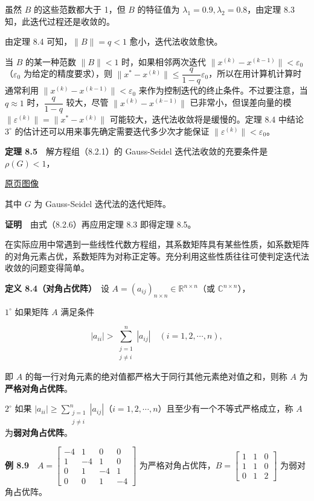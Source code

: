 \documentclass[
  10pt,
  fontset=fandol]{ctexart}
\begin{document}
虽然 \(B\) 的这些范数都大于 1，但 \(B\) 的特征值为 \(\lambda_1=0.9,\lambda_2=0.8\)，由定理 8.3 知，此迭代过程还是收敛的。

由定理 8.4 可知，\(\|B\|=q<1\) 愈小，迭代法收敛愈快。

当 \(B\) 的某一种范数 \(\|B\|<1\) 时，如果相邻两次迭代 \(\|x^{(k)}-x^{(k-1)}\|<\varepsilon_0\)（\(\varepsilon_0\) 为给定的精度要求），则 \(\|x^*-x^{(k)}\|\leqslant\dfrac{q}{1-q}\varepsilon_0\)，所以在用计算机计算时通常利用 \(\|x^{(k)}-x^{(k-1)}\|<\varepsilon_0\) 来作为控制迭代的终止条件。不过要注意，当 \(q\approx1\) 时，\(\dfrac{q}{1-q}\) 较大，尽管 \(\|x^{(k)}-x^{(k-1)}\|\) 已非常小，但误差向量的模 \(\|\varepsilon^{(k)}\|=\|x^*-x^{(k)}\|\) 可能较大，迭代法收敛将是缓慢的。定理 8.4 中结论 \(3^\circ\) 的估计还可以用来事先确定需要迭代多少次才能保证 \(\|\varepsilon^{(k)}\|<\varepsilon_0\)。

\textbf{定理 8.5}　解方程组（8.2.1）的 Gauss-Seidel 迭代法收敛的充要条件是 \(\rho(G)<1\)，

\href{../../source-images/pdf-224.jpeg}{原页图像}

其中 \(G\) 为 Gauss-Seidel 迭代法的迭代矩阵。

\textbf{证明}　由式（8.2.6）再应用定理 8.3 即得定理 8.5。

在实际应用中常遇到一些线性代数方程组，其系数矩阵具有某些性质，如系数矩阵的对角元素占优，系数矩阵为对称正定等。充分利用这些性质往往可使判定迭代法收敛的问题变得简单。

\textbf{定义 8.4（对角占优阵）}　设 \(A=(a_{ij})_{n\times n}\in\mathbb R^{n\times n}\)（或 \(\mathbb C^{n\times n}\)），

\(1^\circ\) 如果矩阵 \(A\) 满足条件

\[
|a_{ii}|>\sum_{\substack{j=1\\j\neq i}}^n|a_{ij}|\quad(i=1,2,\cdots,n),
\tag{8.3.7}
\]

即 \(A\) 的每一行对角元素的绝对值都严格大于同行其他元素绝对值之和，则称 \(A\) 为\textbf{严格对角占优阵}。

\(2^\circ\) 如果 \(|a_{ii}|\geqslant\sum\limits_{\substack{j=1\\j\neq i}}^n|a_{ij}|\)（\(i=1,2,\cdots,n\)）且至少有一个不等式严格成立，称 \(A\) 为\textbf{弱对角占优阵}。

\textbf{例 8.9}　\(A=\begin{bmatrix}-4&1&0&0\\1&-4&1&0\\0&1&-4&1\\0&0&1&-4\end{bmatrix}\) 为严格对角占优阵，\(B=\begin{bmatrix}1&1&0\\1&1&0\\0&1&2\end{bmatrix}\) 为弱对角占优阵。
\end{document}
